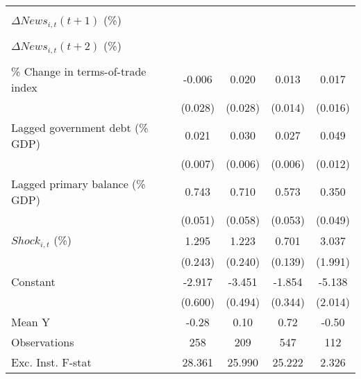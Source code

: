 {\begin{tabular}{l*{4}{c}}
                    &                     &                     &                     &                     \\
\addlinespace
$ \Delta News_{i,t}(t+1)$ (\%)&                     &                     &                     &                     \\
                    &                     &                     &                     &                     \\
\addlinespace
$ \Delta News_{i,t}(t+2)$ (\%)&                     &                     &                     &                     \\
                    &                     &                     &                     &                     \\
\addlinespace
\% Change in terms-of-trade index&      -0.006         &       0.020         &       0.013         &       0.017         \\
                    &     (0.028)         &     (0.028)         &     (0.014)         &     (0.016)         \\
\addlinespace
Lagged government debt (\% GDP)&       0.021\sym{***}&       0.030\sym{***}&       0.027\sym{***}&       0.049\sym{***}\\
                    &     (0.007)         &     (0.006)         &     (0.006)         &     (0.012)         \\
\addlinespace
Lagged primary balance (\% GDP)&       0.743\sym{***}&       0.710\sym{***}&       0.573\sym{***}&       0.350\sym{***}\\
                    &     (0.051)         &     (0.058)         &     (0.053)         &     (0.049)         \\
\addlinespace
$ Shock_{i,t}$ (\%) &       1.295\sym{***}&       1.223\sym{***}&       0.701\sym{***}&       3.037         \\
                    &     (0.243)         &     (0.240)         &     (0.139)         &     (1.991)         \\
\addlinespace
Constant            &      -2.917\sym{***}&      -3.451\sym{***}&      -1.854\sym{***}&      -5.138\sym{**} \\
                    &     (0.600)         &     (0.494)         &     (0.344)         &     (2.014)         \\
\midrule
Mean Y              &       -0.28         &        0.10         &        0.72         &       -0.50         \\
Observations        &         258         &         209         &         547         &         112         \\
Exc. Inst. F-stat   &      28.361         &      25.990         &      25.222         &       2.326         \\
\bottomrule
\end{tabular}
}
